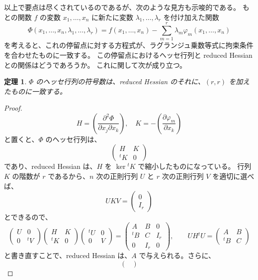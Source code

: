 \documentclass[a4paper]{jsarticle}
\newtheorem{Theorem}{定理}[section]
\theoremstyle{definition}
\theoremstyle{remark}
\begin{document}
以上で要点は尽くされているのであるが、次のような見方も示唆的である。
もとの関数 $f$ の変数 $x_1,\dots,x_n$ に新たに変数 $\lambda_1,\dots,\lambda_r$ を付け加えた関数
\[
\Phi(x_1,\dots,x_n,\lambda_1,\dots, \lambda_r) 
= f(x_1,\dots,x_n) - \sum_{m=1}^r \lambda_m \varphi_m(x_1,\dots,x_n)
\]
を考えると、これの停留点に対する方程式が、ラグランジュ乗数等式に拘束条件を合わせたものに一致する。
この停留点におけるヘッセ行列と reduced Hessian との関係はどうであろうか。
これに関して次が成り立つ。

\begin{Theorem}
$\Phi$ のヘッセ行列の符号数は、reduced Hessian のそれに、$(r,r)$ を加えたものに一致する。
\end{Theorem}

\begin{proof}
\[
H = \left( \frac{\partial^2 \Phi}{\partial x_j\partial x_k}\right), 
\quad 
K = - \left( \frac{\partial \varphi_m}{\partial x_k}\right)
\]
と置くと、$\Phi$ のヘッセ行列は、
\[
\begin{pmatrix}
H & K\\
{}^tK & 0
\end{pmatrix}
\]
であり、reduced Hessian は、$H$ を $\ker {}^tK$ で縮小したものになっている。
行列 $K$ の階数が $r$ であるから、$n$ 次の正則行列 $U$ と $r$ 次の正則行列 $V$ を適切に選べば、
\[
UKV =
\begin{pmatrix}
0\\
I_r
\end{pmatrix}
\]
とできるので、
\[
\begin{pmatrix}
U & 0\\
0 & {}^tV
\end{pmatrix}
\begin{pmatrix}
H & K\\
{}^tK & 0
\end{pmatrix}
\begin{pmatrix}
{}^tU & 0\\
0 & V
\end{pmatrix} 
=
\begin{pmatrix}
A & B & 0\\
{}^tB & C & I_r\\
0 & I_r & 0 
\end{pmatrix}, 
\qquad 
UH{}^tU = 
\begin{pmatrix}
A & B\\
{}^tB & C
\end{pmatrix}
\]
と書き直すことで、reduced Hessian は、$A$ で与えられる。さらに、
\[
\begin{pmatrix}

\end{pmatrix}\]
\end{proof}
\end{document}
